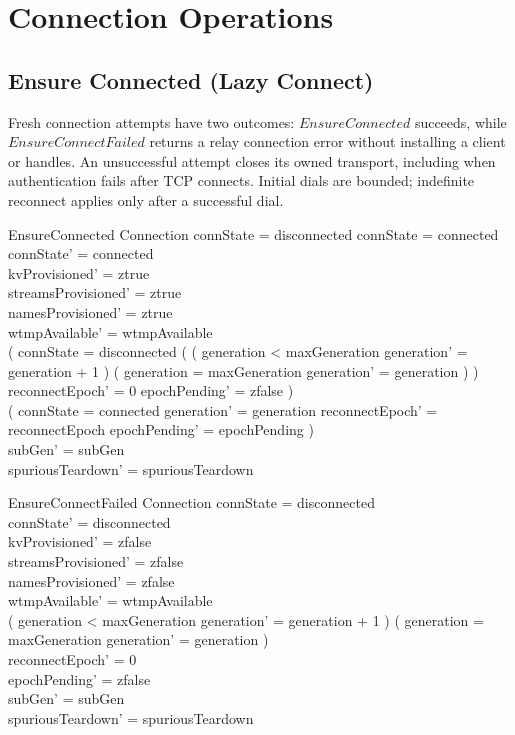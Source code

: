 \documentclass[a4paper,10pt,fleqn]{article}
\begin{document}
\section{Connection Operations}

\subsection{Ensure Connected (Lazy Connect)}

Fresh connection attempts have two outcomes: $EnsureConnected$ succeeds,
while $EnsureConnectFailed$ returns a relay connection error without
installing a client or handles.  An unsuccessful attempt closes its owned
transport, including when authentication fails after TCP connects.  Initial
dials are bounded; indefinite reconnect applies only after a successful dial.

\begin{schema}{EnsureConnected}
  \Delta Connection
  \where
  connState = disconnected \lor connState = connected \\
  connState' = connected \\
  kvProvisioned' = ztrue \\
  streamsProvisioned' = ztrue \\
  namesProvisioned' = ztrue \\
  wtmpAvailable' = wtmpAvailable \\
  ( connState = disconnected \land
    ( ( generation < maxGeneration \land
        generation' = generation + 1 ) \lor
      ( generation = maxGeneration \land
        generation' = generation ) ) \land
    reconnectEpoch' = 0 \land epochPending' = zfalse ) \lor \\
  ( connState = connected \land generation' = generation \land
    reconnectEpoch' = reconnectEpoch \land epochPending' = epochPending ) \\
  subGen' = subGen \\
  spuriousTeardown' = spuriousTeardown
\end{schema}

\begin{schema}{EnsureConnectFailed}
  \Delta Connection
  \where
  connState = disconnected \\
  connState' = disconnected \\
  kvProvisioned' = zfalse \\
  streamsProvisioned' = zfalse \\
  namesProvisioned' = zfalse \\
  wtmpAvailable' = wtmpAvailable \\
  ( generation < maxGeneration \land
    generation' = generation + 1 ) \lor
  ( generation = maxGeneration \land generation' = generation ) \\
  reconnectEpoch' = 0 \\
  epochPending' = zfalse \\
  subGen' = subGen \\
  spuriousTeardown' = spuriousTeardown
\end{schema}
\end{document}
